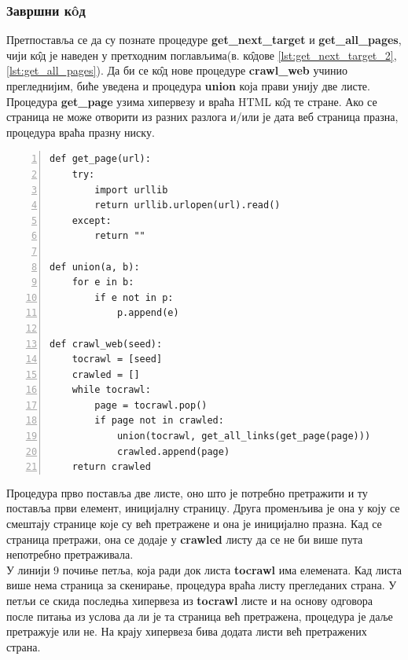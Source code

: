 \documentclass[11pt, serbianc, english, titlepage]{article}
\begin{document}
		\subsubsection{Завршни к\^oд}
		Претпоставља се да су познате процедуре \textbf{get\_next\_target} и \textbf{get\_all\_pages}, чији к\^{о}д је наведен у претходним поглављима(в. к\^{о}дове \ref{lst:get_next_target_2}, \ref{lst:get_all_pages}). Да би се к\^{о}д нове процедуре \textbf{crawl\_web} учинио прегледнијим, биће уведена и процедура \textbf{union} која прави унију две листе. Процедура \textbf{get\_page}  узима хипервезу и враћа HTML к\^{о}д те стране. Ако се страница не може отворити из разних разлога и/или је дата веб страница празна, процедура враћа празну ниску.  
		\begin{lstlisting}[caption=Веб паук, label={lst:crawlweb1}, numbers=left]
def get_page(url):
    try:
        import urllib
        return urllib.urlopen(url).read()
    except:
        return ""
     
def union(a, b):
    for e in b:
        if e not in p:
            p.append(e)

def crawl_web(seed):
    tocrawl = [seed]
    crawled = []
    while tocrawl:
        page = tocrawl.pop()
        if page not in crawled:
            union(tocrawl, get_all_links(get_page(page)))
            crawled.append(page)
    return crawled
		\end{lstlisting}
		Процедура прво поставља две листе, оно што је потребно претражити и ту поставља први елемент, иницијалну страницу. Друга променљива је она у коју се смештају странице које су већ претражене и она је иницијално празна. Кад се страница претражи, она се додаје у \textbf{crawled} листу да се не би више пута непотребно претраживала.\\
		  У линији 9 почиње петља, која ради док листа \textbf{tocrawl} има елемената. Кад листа више нема страница за скенирање, процедура враћа листу прегледаних страна. У петљи се скида последња хипервеза из \textbf{tocrawl} листе и на основу одговора после питања из услова да ли је та страница већ претражена, процедура је даље претражује или не. На крају хипервеза бива додата листи већ претражених страна. 
\end{document}
